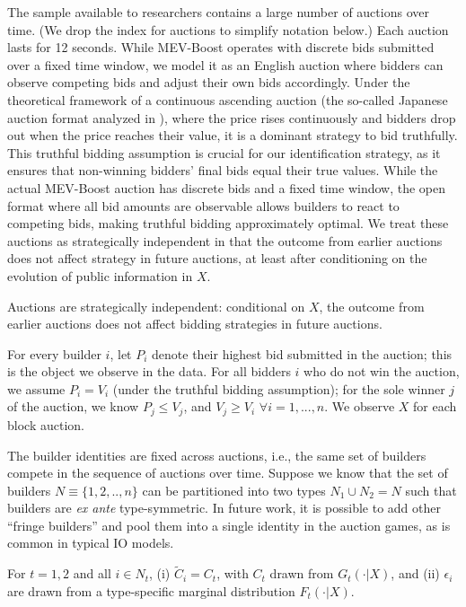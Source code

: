 \documentclass[12pt,reqno]{amsart}
\begin{document}
The sample available to researchers contains a large number of auctions over time. (We drop the index for auctions to simplify notation below.) Each auction lasts for 12 seconds. While MEV-Boost operates with discrete bids submitted over a fixed time window, we model it as an English auction where bidders can observe competing bids and adjust their own bids accordingly. Under the theoretical framework of a continuous ascending auction (the so-called Japanese auction format analyzed in \cite{milgrom1982theory}), where the price rises continuously and bidders drop out when the price reaches their value, it is a dominant strategy to bid truthfully. This truthful bidding assumption is crucial for our identification strategy, as it ensures that non-winning bidders' final bids equal their true values. While the actual MEV-Boost auction has discrete bids and a fixed time window, the open format where all bid amounts are observable allows builders to react to competing bids, making truthful bidding approximately optimal. We treat these auctions as strategically independent in that the outcome from earlier auctions does not affect strategy in future auctions, at least after conditioning on the evolution of public information in $X$. 

\begin{assumption}\label{assum:A3}
Auctions are strategically independent: conditional on $X$, the outcome from earlier auctions does not affect bidding strategies in future auctions.
\end{assumption}

For every builder $i$, let $P_{i}$ denote their highest bid submitted in the auction; this is the object we observe in the data. For all bidders $i$ who do not win the auction, we assume $P_{i}=V_{i}$ (under the truthful bidding assumption); for the sole winner $j$ of the auction, we know $P_{j}\leq V_{j}$, and $V_{j}\geq V_{i}$ $\forall i=1,...,n$. We observe $X$ for each block auction.

The builder identities are fixed across auctions, i.e., the same set of builders compete in the sequence of auctions over time. Suppose we know that the set of builders $N\equiv \{1,2,..,n\}$ can be partitioned into two types $N_{1}\cup N_{2}=N$ such that builders are \textit{ex ante} type-symmetric. In future work, it is possible to add other ``fringe builders'' and pool them into a single identity in the auction games, as is common in typical IO models.

\begin{assumption}\label{assum:A1}
For $t=1,2$ and all $i\in N_{t}$, (i) $\tilde{C}_{i}=C_{t}$, with $C_{t}$ drawn from $G_{t}(\cdot |X)$, and (ii) $\epsilon _{i}$ are drawn from a type-specific marginal distribution $F_{t}(\cdot |X)$.
\end{assumption}
\end{document}
